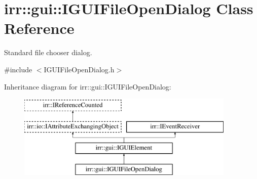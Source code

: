 \hypertarget{classirr_1_1gui_1_1IGUIFileOpenDialog}{}\section{irr\+:\+:gui\+:\+:I\+G\+U\+I\+File\+Open\+Dialog Class Reference}
\label{classirr_1_1gui_1_1IGUIFileOpenDialog}


Standard file chooser dialog.  




{\ttfamily \#include $<$I\+G\+U\+I\+File\+Open\+Dialog.\+h$>$}

Inheritance diagram for irr\+:\+:gui\+:\+:I\+G\+U\+I\+File\+Open\+Dialog\+:\begin{figure}[H]
\begin{center}
\leavevmode
\includegraphics[height=4.000000cm]{classirr_1_1gui_1_1IGUIFileOpenDialog}
\end{center}
\end{figure}

